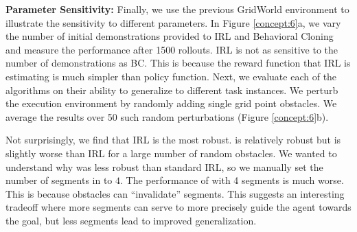 \vspace{0.5em} \noindent \textbf{Parameter Sensitivity: } Finally, we use the previous GridWorld environment to illustrate the sensitivity to different parameters. In Figure \ref{concept:6}a, we vary the number of initial demonstrations provided to IRL and Behavioral Cloning and measure the performance after 1500 rollouts.
IRL is not as sensitive to the number of demonstrations as BC.
This is because the reward function that IRL is estimating is much simpler than policy function.
Next, we evaluate each of the algorithms on their ability to generalize to different task instances.
We perturb the execution environment by randomly adding single grid point obstacles.
We average the results over 50 such random perturbations (Figure \ref{concept:6}b).

Not surprisingly, we find that IRL is the most robust.
\hirl is relatively robust but is slightly worse than IRL for a large number of random obstacles.
We wanted to understand why \hirl was less robust than standard IRL, so we manually set the number of segments in \hirl to $4$.
The performance of \hirl with 4 segments is much worse.
This is because obstacles can ``invalidate'' segments.
This suggests an interesting tradeoff where more segments can serve to more precisely guide the agent towards the goal, but less segments lead to improved generalization.